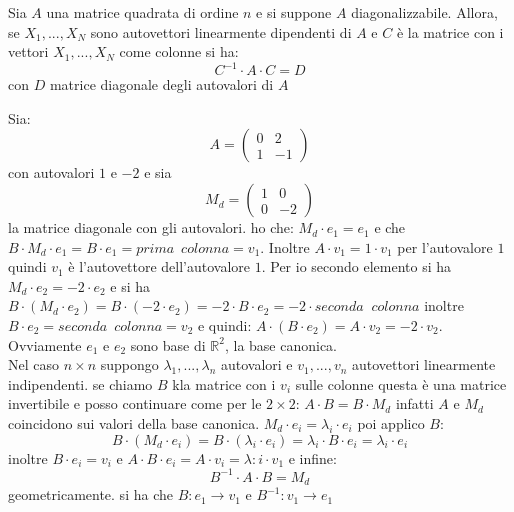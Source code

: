 \documentclass[a4paper,12pt, oneside]{book}
\begin{document}
\begin{teorema}
Sia $A$ una matrice quadrata di ordine $n$ e si suppone $A$ diagonalizzabile. Allora, se $X_1,...,X_N$ sono autovettori linearmente dipendenti di $A$ e $C$ è la matrice con i vettori $X_1,...,X_N$ come colonne si ha:
$$C^{-1}\cdot A \cdot C=D$$
con $D$ matrice diagonale degli autovalori di $A$
\end{teorema}
Sia:
$$
A=\left(\begin{matrix}
0 & 2\\
1 & -1
\end{matrix}\right)
$$
con autovalori $1 $ e $-2$ e sia $$
M_d=\left(\begin{matrix}
1 & 0\\
0 & -2
\end{matrix}\right)
$$ la matrice diagonale con gli autovalori.
ho che: $M_d\cdot e_1=e_1$ e che $B\cdot M_d\cdot e_1=B\cdot e_1= prima \,\,\, colonna=v_1$. Inoltre $A\cdot v_1=1\cdot v_1$ per l'autovalore $1$ quindi $v_1$ è l'autovettore dell'autovalore $1$. Per io secondo elemento si ha  $M_d\cdot e_2=-2\cdot e_2$ e si ha $B\cdot(M_d\cdot e_2)=B\cdot (-2\cdot e_2)=-2\cdot B\cdot e_2=-2\cdot seconda\,\,\ colonna$
inoltre $B\cdot e_2=seconda\,\,\, colonna=v_2$ e quindi: $A\cdot(B\cdot e_2)=A\cdot v_2=-2\cdot v_2$. Ovviamente $e_1$ e $e_2$ sono base di $\mathbb{R}^2$, la base canonica.\\
Nel caso $n\times n$ suppongo $\lambda_1,...,\lambda_n$ autovalori e $v_1,...,v_n$ autovettori linearmente indipendenti. se chiamo $B$ kla matrice con i $v_i$ sulle colonne questa è una matrice invertibile e posso continuare come per le $2\times 2$: $A\cdot B= B\cdot M_d$ infatti $A$ e $M_d$ coincidono sui valori della base canonica. $M_d\cdot e_i=\lambda_i\cdot e_i$ poi applico $B$: $$B\cdot (M_d\cdot e_i)=B\cdot(\lambda_i\cdot e_i)=\lambda_i\cdot B\cdot e_i=\lambda_i\cdot e_i$$
inoltre $B\cdot e_i=v_i$ e $A\cdot B\cdot e_i=A\cdot v_i=\lambda:i\cdot v_1$ e infine:
$$B^{-1}\cdot A\cdot B=M_d$$
geometricamente. si ha che $B:e_1\to v_1$ e $B^{-1}:v_1\to e_1$
\end{document}
